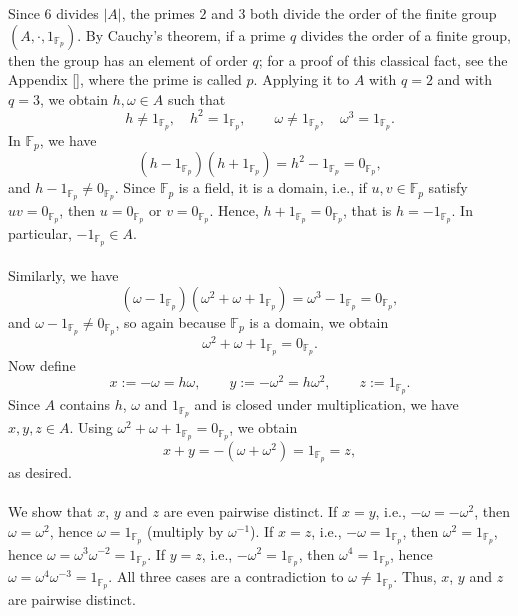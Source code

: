 \begin{solution}
    Since \( 6 \) divides \( \left| A \right| \), the primes \( 2 \) and \( 3 \) both divide the order of the finite group \( \left(A, \cdot, 1_{\mathbb{F}_{p}}\right) \). By Cauchy's theorem, if a prime \( q \) divides the order of a finite group, then the group has an element of order \( q \); for a proof of this classical fact, see the Appendix [], where the prime is called \( p \). Applying it to \( A \) with \( q = 2 \) and with \( q = 3 \), we obtain \( h, \omega \in A \) such that
    \[
        h \neq 1_{\mathbb{F}_{p}}, \quad h^{2} = 1_{\mathbb{F}_{p}}, \qquad \omega \neq 1_{\mathbb{F}_{p}}, \quad \omega^{3} = 1_{\mathbb{F}_{p}}.
    \]
    In \( \mathbb{F}_{p} \), we have
    \[
        \left(h - 1_{\mathbb{F}_{p}}\right)\left(h + 1_{\mathbb{F}_{p}}\right) = h^{2} - 1_{\mathbb{F}_{p}} = 0_{\mathbb{F}_{p}},
    \]
    and \( h - 1_{\mathbb{F}_{p}} \neq 0_{\mathbb{F}_{p}} \). Since \( \mathbb{F}_{p} \) is a field, it is a domain, i.e., if \( u, v \in \mathbb{F}_{p} \) satisfy \( uv = 0_{\mathbb{F}_{p}} \), then \( u = 0_{\mathbb{F}_{p}} \) or \( v = 0_{\mathbb{F}_{p}} \). Hence, \( h + 1_{\mathbb{F}_{p}} = 0_{\mathbb{F}_{p}} \), that is \( h = -1_{\mathbb{F}_{p}} \). In particular, \( -1_{\mathbb{F}_{p}} \in A \).
    \\\\
    Similarly, we have
    \[
        \left(\omega - 1_{\mathbb{F}_{p}}\right)\left(\omega^{2} + \omega + 1_{\mathbb{F}_{p}}\right) = \omega^{3} - 1_{\mathbb{F}_{p}} = 0_{\mathbb{F}_{p}},
    \]
    and \( \omega - 1_{\mathbb{F}_{p}} \neq 0_{\mathbb{F}_{p}} \), so again because \( \mathbb{F}_{p} \) is a domain, we obtain
    \[
        \omega^{2} + \omega + 1_{\mathbb{F}_{p}} = 0_{\mathbb{F}_{p}}.
    \]
    Now define
    \[
        x := -\omega = h\omega, \qquad y := -\omega^{2} = h\omega^{2}, \qquad z := 1_{\mathbb{F}_{p}}.
    \]
    Since \( A \) contains \( h \), \( \omega \) and \( 1_{\mathbb{F}_{p}} \) and is closed under multiplication, we have \( x, y, z \in A \). Using \( \omega^{2} + \omega + 1_{\mathbb{F}_{p}} = 0_{\mathbb{F}_{p}} \), we obtain
    \[
        x + y = -\left(\omega + \omega^{2}\right) = 1_{\mathbb{F}_{p}} = z,
    \]
    as desired.
    \\\\
    We show that \( x \), \( y \) and \( z \) are even pairwise distinct. If \( x = y \), i.e., \( -\omega = -\omega^{2} \), then \( \omega = \omega^{2} \), hence \( \omega = 1_{\mathbb{F}_{p}} \) (multiply by \( \omega^{-1} \)). If \( x = z \), i.e., \( -\omega = 1_{\mathbb{F}_{p}} \), then \( \omega^{2} = 1_{\mathbb{F}_{p}} \), hence \( \omega = \omega^{3} \omega^{-2} = 1_{\mathbb{F}_{p}} \). If \( y = z \), i.e., \( -\omega^{2} = 1_{\mathbb{F}_{p}} \), then \( \omega^{4} = 1_{\mathbb{F}_{p}} \), hence \( \omega = \omega^{4} \omega^{-3} = 1_{\mathbb{F}_{p}} \). All three cases are a contradiction to \( \omega \neq 1_{\mathbb{F}_{p}} \). Thus, \( x \), \( y \) and \( z \) are pairwise distinct.
\end{solution}
